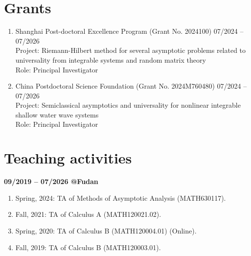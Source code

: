 \documentclass[margin]{res}
\begin{document}
\begin{resume}
\section{Grants}
\begin{enumerate}[--]
\item Shanghai Post-doctoral Excellence Program (Grant No. 2024100) \hfill 07/2024 -- 07/2026  \\
Project: Riemann-Hilbert method for several asymptotic problems related to universality from integrable systems and random matrix theory  \\
Role: Principal Investigator

\item China Postdoctoral Science Foundation (Grant No. 2024M760480)  \hfill 07/2024 -- 07/2026\\
Project: Semiclassical asymptotics and universality for nonlinear integrable shallow water wave systems \\
Role: Principal Investigator
\end{enumerate}



\section{Teaching activities}
\textbf{09/2019 -- 07/2026 @Fudan}
\begin{enumerate}[--]
\item Spring, 2024: TA of Methods of Asymptotic Analysis (MATH630117).
\item Fall, 2021: TA of Calculus A (MATH120021.02).
\item Spring, 2020: TA of Calculus B (MATH120004.01) (Online).
\item Fall, 2019: TA of Calculus B (MATH120003.01).
\end{enumerate}



\end{resume}
\end{document}
